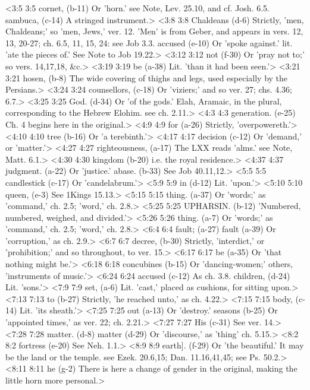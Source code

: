 <3:5 3:5  cornet, (b-11)  Or 'horn.' see Note, Lev. 25.10, and cf. Josh. 6.5.
  sambuca, (c-14)  A stringed instrument.>
<3:8 3:8  Chaldeans (d-6)  Strictly, 'men, Chaldeans;' so 'men, Jews,' ver. 12. 'Men' is  from Geber, and appears in vers. 12, 13, 20-27; ch. 6.5, 11, 15, 24: see Job 3.3.
  accused (e-10)  Or 'spoke against.' lit. 'ate the pieces of.' See Note to Job 19.22.>
<3:12 3:12  not (f-30)  Or 'pray not to;' so vers. 14,17,18, &c.>
<3:19 3:19  be (a-38)  Lit. 'than it had been seen.'>
<3:21 3:21  hosen, (b-8)  The wide covering of thighs and legs, used especially by the  Persians.>
<3:24 3:24  counsellors, (c-18)  Or 'viziers;' and so ver. 27; chs. 4.36; 6.7.>
<3:25 3:25  God. (d-34)  Or 'of the gods.' Elah, Aramaic, in the plural,  corresponding to the Hebrew Elohim. see ch. 2.11.>
<4:3 4:3  generation. (e-25)  Ch. 4 begins here in the original.>
<4:9 4:9  for (a-26)  Strictly, 'overpowereth.'>
<4:10 4:10  tree (b-16)  Or 'a terebinth.'>
<4:17 4:17  decision (c-12)  Or 'demand,' or 'matter.'>
<4:27 4:27  righteousness, (a-17)  The LXX reads 'alms.' see Note, Matt. 6.1.>
<4:30 4:30  kingdom (b-20)  i.e. the royal residence.>
<4:37 4:37  judgment. (a-22)  Or 'justice.'
  abase. (b-33)  See Job 40.11,12.>
<5:5 5:5  candlestick (c-17)  Or 'candelabrum.'>
<5:9 5:9  in (d-12)  Lit. 'upon.'>
<5:10 5:10  queen, (e-3)  See 1Kings 15.13.>
<5:15 5:15  thing. (a-37) Or 'words;' as 'command,' ch. 2.5; 'word,' ch. 2.8.>
<5:25 5:25  UPHARSIN. (b-12)  'Numbered, numbered, weighed, and divided.'>
<5:26 5:26  thing. (a-7)  Or 'words;' as 'command,' ch. 2.5; 'word,' ch. 2.8.>
<6:4 6:4  fault; (a-27)  fault (a-39)
  Or 'corruption,' as ch. 2.9.>
<6:7 6:7  decree, (b-30)  Strictly, 'interdict,' or 'prohibition;' and so throughout,  to ver. 15.>
<6:17 6:17  be (a-35)  Or 'that nothing might be.'>
<6:18 6:18  concubines (b-15)  Or 'dancing-women;' others, 'instruments of music.'>
<6:24 6:24  accused (c-12)  As ch. 3.8.
  children, (d-24)  Lit. 'sons.'>
<7:9 7:9  set, (a-6)  Lit. 'cast,' placed as cushions, for sitting upon.>
<7:13 7:13  to (b-27)  Strictly, 'he reached unto,' as ch. 4.22.>
<7:15 7:15  body, (c-14)  Lit. 'its sheath.'>
<7:25 7:25  out (a-13)  Or 'destroy.'
  seasons (b-25)  Or 'appointed times,' as ver. 22; ch. 2.21.>
<7:27 7:27  His (c-31)  See ver. 14.>
<7:28 7:28  matter. (d-8)  matter (d-29)
  Or 'discourse,' as 'thing' ch. 5.15.>
<8:2 8:2  fortress (e-20)  See Neh. 1.1.>
<8:9 8:9  earth]. (f-29)  Or 'the beautiful.' It may be the land or the temple. see  Ezek. 20.6,15; Dan. 11.16,41,45; see Ps. 50.2.>
<8:11 8:11  he (g-2)  There is here a change of gender in the original, making the  little horn more personal.>
